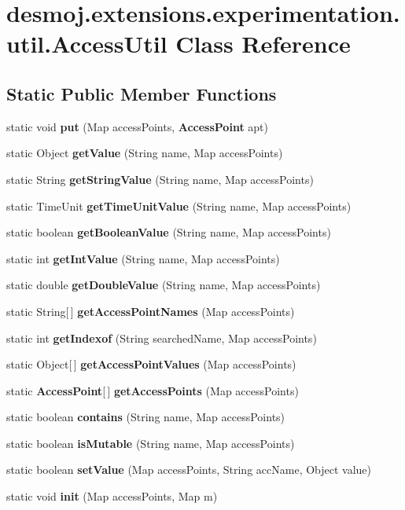 \section{desmoj.\-extensions.\-experimentation.\-util.\-Access\-Util Class Reference}
\label{classdesmoj_1_1extensions_1_1experimentation_1_1util_1_1_access_util}
\subsection*{Static Public Member Functions}
\begin{DoxyCompactItemize}
\item 
static void {\bf put} (Map access\-Points, {\bf Access\-Point} apt)
\item 
static Object {\bf get\-Value} (String name, Map access\-Points)
\item 
static String {\bf get\-String\-Value} (String name, Map access\-Points)
\item 
static Time\-Unit {\bf get\-Time\-Unit\-Value} (String name, Map access\-Points)
\item 
static boolean {\bf get\-Boolean\-Value} (String name, Map access\-Points)
\item 
static int {\bf get\-Int\-Value} (String name, Map access\-Points)
\item 
static double {\bf get\-Double\-Value} (String name, Map access\-Points)
\item 
static String[$\,$] {\bf get\-Access\-Point\-Names} (Map access\-Points)
\item 
static int {\bf get\-Indexof} (String searched\-Name, Map access\-Points)
\item 
static Object[$\,$] {\bf get\-Access\-Point\-Values} (Map access\-Points)
\item 
static {\bf Access\-Point}[$\,$] {\bf get\-Access\-Points} (Map access\-Points)
\item 
static boolean {\bf contains} (String name, Map access\-Points)
\item 
static boolean {\bf is\-Mutable} (String name, Map access\-Points)
\item 
static boolean {\bf set\-Value} (Map access\-Points, String acc\-Name, Object value)
\item 
static void {\bf init} (Map access\-Points, Map m)
\end{DoxyCompactItemize}


